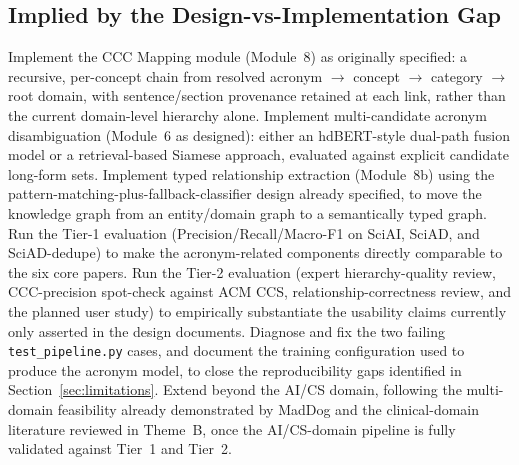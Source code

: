 \documentclass[10pt,conference]{IEEEtran}
\begin{document}
\subsection{Implied by the Design-vs-Implementation Gap}
Implement the CCC Mapping module (Module~8) as originally specified: a recursive, per-concept chain from resolved acronym $\rightarrow$ concept $\rightarrow$ category $\rightarrow$ root domain, with sentence/section provenance retained at each link, rather than the current domain-level hierarchy alone. Implement multi-candidate acronym disambiguation (Module~6 as designed): either an hdBERT-style dual-path fusion model or a retrieval-based Siamese approach, evaluated against explicit candidate long-form sets. Implement typed relationship extraction (Module~8b) using the pattern-matching-plus-fallback-classifier design already specified, to move the knowledge graph from an entity/domain graph to a semantically typed graph. Run the Tier-1 evaluation (Precision/Recall/Macro-F1 on SciAI, SciAD, and SciAD-dedupe) to make the acronym-related components directly comparable to the six core papers. Run the Tier-2 evaluation (expert hierarchy-quality review, CCC-precision spot-check against ACM CCS, relationship-correctness review, and the planned user study) to empirically substantiate the usability claims currently only asserted in the design documents. Diagnose and fix the two failing \texttt{test\_pipeline.py} cases, and document the training configuration used to produce the acronym model, to close the reproducibility gaps identified in Section~\ref{sec:limitations}. Extend beyond the AI/CS domain, following the multi-domain feasibility already demonstrated by MadDog and the clinical-domain literature reviewed in Theme~B, once the AI/CS-domain pipeline is fully validated against Tier~1 and Tier~2.
\end{document}
